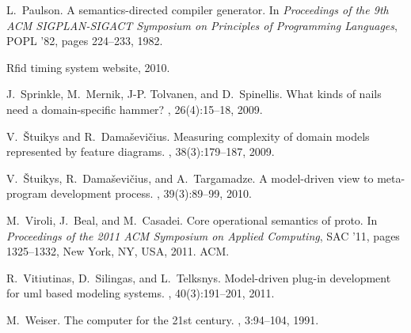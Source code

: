 \documentclass[preprint, prX]{revtex4}
\begin{document}
\begin{thebibliography}{10}
L.~Paulson.
\newblock A semantics-directed compiler generator.
\newblock In {\em Proceedings of the 9th ACM SIGPLAN-SIGACT Symposium on
  Principles of Programming Languages}, POPL '82, pages 224--233, 1982.

Rfid timing system website, 2010.

J.~Sprinkle, M.~Mernik, J-P. Tolvanen, and D.~Spinellis.
\newblock What kinds of nails need a domain-specific hammer?
, 26(4):15--18, 2009.

V.~\v{S}tuikys and R.~Dama\v{s}evi\v{c}ius.
\newblock Measuring complexity of domain models represented by feature
  diagrams.
,
  38(3):179--187, 2009.

V.~\v{S}tuikys, R.~Dama\v{s}evi\v{c}ius, and A.~Targamadze.
\newblock A model-driven view to meta-program development process.
,
  39(3):89--99, 2010.

M.~Viroli, J.~Beal, and M.~Casadei.
\newblock Core operational semantics of proto.
\newblock In {\em Proceedings of the 2011 ACM Symposium on Applied Computing},
  SAC '11, pages 1325--1332, New York, NY, USA, 2011. ACM.

R.~Vitiutinas, D.~Silingas, and L.~Telksnys.
\newblock Model-driven plug-in development for uml based modeling systems.
,
  40(3):191--201, 2011.

M.~Weiser.
\newblock The computer for the 21st century.
, 3:94--104, 1991.

\end{thebibliography}

\end{document}
